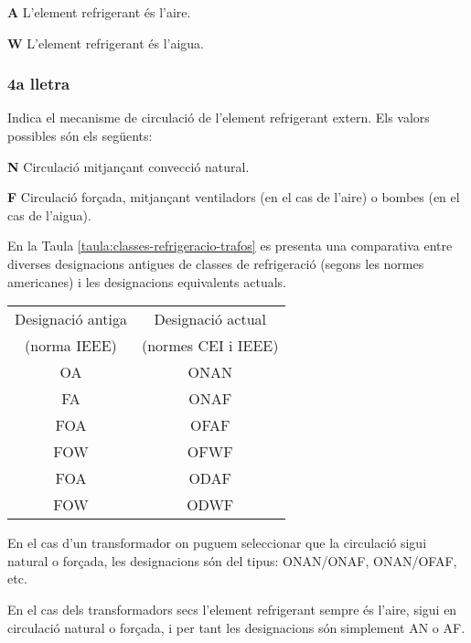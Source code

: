 \begin{list}{}
   {\setlength{\labelwidth}{10mm} \setlength{\leftmargin}{10mm} \setlength{\labelsep}{2mm}}
   \item[\textbf{A}] L'element refrigerant és l'aire.
   \item[\textbf{W}] L'element refrigerant és l'aigua.
\end{list}
 

\subsubsection*{4a lletra}
 Indica el mecanisme de circulació de l'element
refrigerant extern. Els valors possibles són els següents:
\begin{list}{}
   {\setlength{\labelwidth}{10mm} \setlength{\leftmargin}{10mm} \setlength{\labelsep}{2mm}}
   \item[\textbf{N}] Circulació mitjançant convecció natural.
   \item[\textbf{F}] Circulació forçada, mitjançant ventiladors (en el cas de
   l'aire) o bombes (en el cas de l'aigua).
\end{list}
 

En la Taula \vref{taula:classes-refrigeracio-trafos} es presenta una
comparativa entre diverses designacions antigues de classes de
refrigeració (segons les normes americanes) i les designacions
equivalents actuals.

\begin{center}
   \label{taula:classes-refrigeracio-trafos}
   \begin{tabular}{cc}
   \toprule[1pt]
   Designació antiga & Designació actual \\
   (norma IEEE)     & (normes CEI i IEEE) \\
   \midrule
   OA & ONAN   \\
   FA & ONAF   \\
   FOA & OFAF  \\
   FOW & OFWF  \\
   FOA & ODAF  \\
   FOW & ODWF \\
   \bottomrule[1pt]
   \end{tabular}
\end{center}

En el cas d'un transformador on puguem seleccionar que la circulació
sigui natural o forçada,
les designacions són del tipus: ONAN/ONAF, ONAN/OFAF, etc.

En el cas dels transformadors secs l'element refrigerant sempre és
l'aire, sigui en circulació natural o forçada, i per tant les
designacions són simplement AN o AF.






